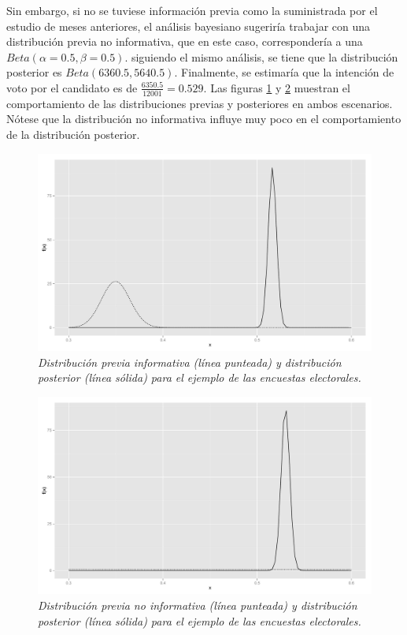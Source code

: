 \begin{Eje}
    Sin embargo, si no se tuviese informaci\'on previa como la suministrada por el estudio de meses anteriores, el an\'alisis bayesiano sugerir\'ia trabajar con una distribuci\'on previa no informativa, que en este caso, corresponder\'ia a una $Beta(\alpha=0.5, \beta=0.5)$. siguiendo el mismo an\'alisis, se tiene que la distribuci\'on posterior es $Beta(6360.5, 5640.5)$. Finalmente, se estimar\'ia que la intenci\'on de voto por el candidato es de $\frac{6350.5}{12001}=0.529$. Las figuras \ref{BernoEj1} y \ref{BernoEj2} muestran el comportamiento de las distribuciones previas y posteriores en ambos escenarios. N\'otese que la distribuci\'on no informativa influye muy poco en el comportamiento de la distribuci\'on posterior.
    
    \begin{figure}[!h]
    \centering
    \includegraphics[scale=0.28]{BernoEj1.pdf}
    \caption{\emph{Distribuci\'on previa informativa (l\'inea punteada) y distribuci\'on posterior (l\'inea s\'olida) para el ejemplo de las encuestas electorales.}}
    \label{BernoEj1}
    \end{figure}
    
    \begin{figure}[!h]
    \centering
    \includegraphics[scale=0.28]{BernoEj2.pdf}
    \caption{\emph{Distribuci\'on previa no informativa (l\'inea punteada) y distribuci\'on posterior (l\'inea s\'olida) para el ejemplo de las encuestas electorales.}}
    \label{BernoEj2}
    \end{figure}
    

\end{Eje}
